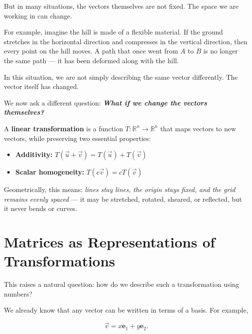\documentclass[11pt,openany]{book}
\theoremstyle{definition}
\begin{document}
\medskip

But in many situations, the vectors themselves are not fixed. The space we are working in 
can change.

\medskip

For example, imagine the hill is made of a flexible material. If the ground stretches 
in the horizontal direction and compresses in the vertical direction, then every point 
on the hill moves. A path that once went from $A$ to $B$ is no longer the same path --- 
it has been deformed along with the hill.

\medskip

In this situation, we are not simply describing the same vector differently. 
The vector itself has changed.

\medskip



We now ask a different question: \textbf{\textit{What if we change the vectors themselves?}}


\medskip

A \textbf{linear transformation} is a function $T: \mathbb{R}^n \to \mathbb{R}^n$ that maps vectors 
to new vectors, while preserving two essential properties:

\begin{itemize}
  \item \textbf{Additivity:} $T(\vec{u} + \vec{v}) = T(\vec{u}) + T(\vec{v})$
  \item \textbf{Scalar homogeneity:} $T(c\vec{v}) = cT(\vec{v})$
\end{itemize}

Geometrically, this means: \textit{lines stay lines, the origin stays fixed, and the grid 
remains evenly spaced} --- it may be stretched, rotated, sheared, or reflected, but it 
never bends or curves.

\section{Matrices as Representations of Transformations}

This raises a natural question: how do we describe such a transformation using numbers?

\medskip

We already know that any vector can be written in terms of a basis. For example,

\[
\vec{v} = x\mathbf{e}_1 + y\mathbf{e}_2.
\]
\end{document}
